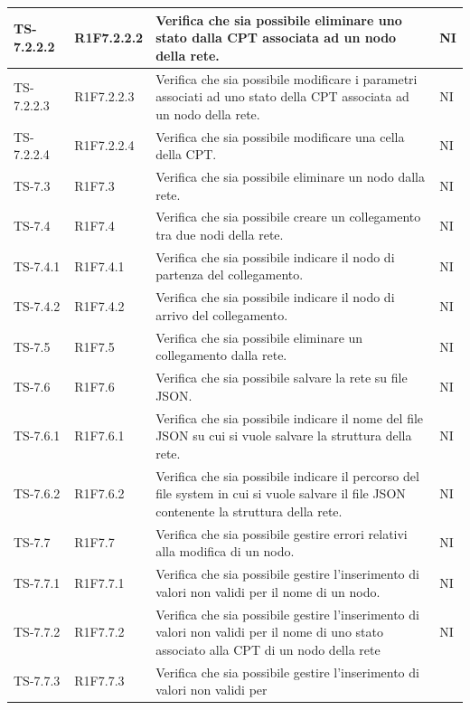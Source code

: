 \begin{longtable}{|C{2.5cm}|C{2.5cm}|C{6.5cm}|C{1.5cm}|}
			\hline
			{TS-7.2.2.2} & {R1F7.2.2.2} & Verifica che sia possibile eliminare uno
			stato dalla CPT associata ad un nodo
			della rete.  & {NI}\\
			\hline
			{TS-7.2.2.3} & {R1F7.2.2.3} & Verifica che sia possibile modificare i
			parametri associati ad uno stato della
			CPT associata ad un nodo della rete.  & {NI}\\
			\hline
			{TS-7.2.2.4} & {R1F7.2.2.4} & Verifica che sia possibile modificare una
			cella della CPT.  & {NI}\\
			\hline
			{TS-7.3} & {R1F7.3} & Verifica che sia possibile eliminare un
			nodo dalla rete.  & {NI}\\
			\hline
			{TS-7.4} & {R1F7.4} & Verifica che sia possibile creare un
			collegamento tra due nodi della rete.  & {NI}\\
			\hline
			{TS-7.4.1} & {R1F7.4.1} & Verifica che sia possibile indicare il nodo
			di partenza del collegamento.  & {NI}\\
			\hline
			{TS-7.4.2} & {R1F7.4.2} & Verifica che sia possibile indicare il nodo
			di arrivo del collegamento.  & {NI}\\
			\hline
			{TS-7.5} & {R1F7.5} & Verifica che sia possibile eliminare un
			collegamento dalla rete.  & {NI}\\
			\hline
			{TS-7.6} & {R1F7.6} & Verifica che sia possibile salvare la rete su
			file JSON.  & {NI}\\
			\hline
			{TS-7.6.1} & {R1F7.6.1} & Verifica che sia possibile indicare il nome
			del file JSON su cui si vuole salvare la
			struttura della rete.  & {NI}\\
			\hline
			{TS-7.6.2} & {R1F7.6.2} & Verifica che sia possibile indicare il
			percorso del file system in cui si vuole
			salvare il file JSON contenente la
			struttura della rete.  & {NI}\\
			\hline
			{TS-7.7} & {R1F7.7} & Verifica che sia possibile gestire errori
			relativi alla modifica di un nodo.  & {NI}\\
			\hline
			{TS-7.7.1} & {R1F7.7.1} & Verifica che sia  possibile gestire
			l'inserimento di valori non validi per il
			nome di un nodo.  & {NI}\\
			\hline
			{TS-7.7.2} & {R1F7.7.2} & Verifica che sia possibile gestire
			l'inserimento di valori non validi per il
			nome di uno stato associato alla CPT
			di un nodo della rete  & {NI}\\
			\hline
			{TS-7.7.3} & {R1F7.7.3} & Verifica che sia possibile gestire
			l'inserimento di valori non validi per

\end{longtable}
